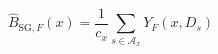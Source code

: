 \documentclass{article}
\begin{document}
\begin{equation*}
\widehat B_{\mathrm{SG},F}(x)=\frac{1}{c_x}\sum_{s\in\mathcal A_x}Y_F(x,D_s)
\end{equation*}
\end{document}
